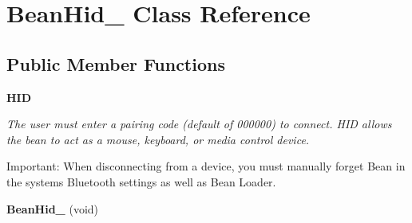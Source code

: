 \hypertarget{class_bean_hid__}{}\section{Bean\+Hid\+\_\+ Class Reference}
\label{class_bean_hid__}
\subsection*{Public Member Functions}
\begin{Indent}{\bf H\+I\+D}\par
{\em The user must enter a pairing code (default of 000000) to connect. H\+I\+D allows the bean to act as a mouse, keyboard, or media control device.

Important\+: When disconnecting from a device, you must manually forget Bean in the system\textquotesingle{}s Bluetooth settings as well as Bean Loader. }\begin{DoxyCompactItemize}
\item 
\hypertarget{class_bean_hid___a06070026a127db3b3523256a84f1f3b9}{}{\bfseries Bean\+Hid\+\_\+} (void)\label{class_bean_hid___a06070026a127db3b3523256a84f1f3b9}


\end{DoxyCompactItemize}
\end{Indent}
